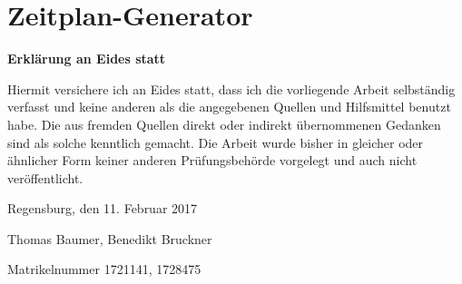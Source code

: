 \documentclass[11pt,a4paper,german,notitlepage]{report}
\newcommand{\authorname}{Thomas Baumer, Benedikt Bruckner}
\newcommand{\matrikelnr}{1721141, 1728475}
\newcommand{\abgabedatum}{11. Februar 2017}
\begin{document}
\newpage

{}
\appendix
\appendixpage


\chapter{Zeitplan-Generator}
\label{chap:anhang_1}



\clearpage

{}



\clearpage

%
%
%

\thispagestyle{empty}
\label{erklaerung}

\setlength{\parindent}{0em}

\textbf{\large{Erklärung an Eides statt}}

\vspace*{20pt}
Hiermit versichere ich an Eides statt, dass ich die vorliegende Arbeit selbständig verfasst und keine anderen als die angegebenen Quellen und Hilfsmittel benutzt habe. Die aus fremden Quellen direkt oder indirekt übernommenen Gedanken sind als solche kenntlich gemacht. Die Arbeit wurde bisher in gleicher oder ähnlicher Form keiner anderen Prüfungsbehörde vorgelegt und auch nicht veröffentlicht.

\vspace*{65pt}


Regensburg, den \abgabedatum

\vspace*{60pt}


\authorname

Matrikelnummer \matrikelnr
\end{document}
